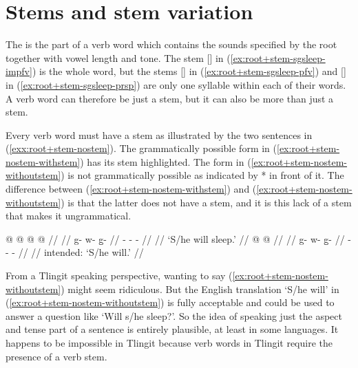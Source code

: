 \section{Stems and stem variation}\label{sec:root+stem-stems}

The  is the part of a verb word which contains the sounds specified by the root together with vowel length and tone. The stem [] in (\ref{ex:root+stem-sgsleep-impfv}) is the whole word, but the stems [] in (\ref{ex:root+stem-sgsleep-pfv}) and [] in (\ref{ex:root+stem-sgsleep-prsp}) are only one syllable within each of their words. A verb word can therefore be just a stem, but it can also be more than just a stem.

Every verb word must have a stem as illustrated  by the two sentences in (\ref{exx:root+stem-nostem}). The grammatically possible form in (\ref{ex:root+stem-nostem-withstem}) has its stem highlighted. The form in (\ref{ex:root+stem-nostem-withoutstem}) is not grammatically possible as indicated by * in front of it. The difference between (\ref{ex:root+stem-nostem-withstem}) and (\ref{ex:root+stem-nostem-withoutstem}) is that the latter does not have a stem, and it is this lack of a stem that makes it ungrammatical.

\pex\label{exx:root+stem-nostem}%
\a\label{ex:root+stem-nostem-withstem}%
%
\begingl
	\gla	{} @ {} @ {} @ {} @ {} //
	\glp	\llap{[}\rlap{\ipa{kʷùː.qà.ˈ\gm{tʰàː}}]} {} {} {} {} //
	\glb	g- w- g̱-   //
	\glc	{}- - -   //
	\gld	{} {} {} {} {} //
	\glft	‘S/he will sleep.’
		//
\endgl
\a\label{ex:root+stem-nostem-withoutstem}%
\ljudge{*}%
%
\begingl
	\gla	{} @ {} @ {} //
	\glp	\llap{[}\rlap{\ipa{kʷùː.qà}]} {} {} //
	\glb	g- w- g̱- //
	\glc	{}- - - //
	\gld	{} {} {} //
	\glft	intended: ‘S/he will.’
		//
\endgl
\xe

From a Tlingit speaking perspective, wanting to say (\ref{ex:root+stem-nostem-withoutstem}) might seem ridiculous. But the English translation ‘S/he will’ in (\ref{ex:root+stem-nostem-withoutstem}) is fully acceptable and could be used to answer a question like ‘Will s/he sleep?’. So the idea of speaking just the aspect and tense part of a sentence is entirely plausible, at least in some languages. It happens to be impossible in Tlingit because verb words in Tlingit require the presence of a verb stem.

